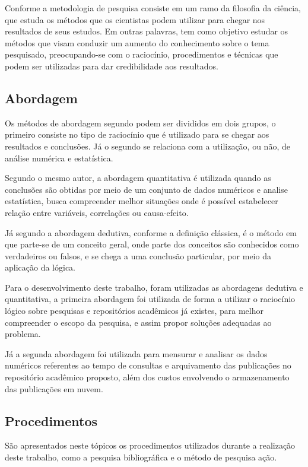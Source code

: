 Conforme \citep[p. 15]{LOVATO:metodologia} a metodologia de pesquisa
consiste em um ramo da filosofia da ciência, que estuda os métodos que
os cientistas podem utilizar para chegar nos resultados de seus estudos.
Em outras palavras, tem como objetivo estudar os métodos que visam
conduzir um aumento do conhecimento sobre o tema pesquisado, preocupando-se
com o raciocínio, procedimentos e técnicas que podem ser utilizadas para
dar credibilidade aos resultados.

\subsection{Abordagem}

Os métodos de abordagem segundo \citep[p. 29]{LOVATO:metodologia} podem ser
divididos em dois grupos, o primeiro consiste no tipo de raciocínio que
é utilizado para se chegar aos resultados e conclusões. Já o segundo
se relaciona com a utilização, ou não, de análise numérica e estatística.

Segundo o mesmo autor, a abordagem quantitativa é utilizada quando
as conclusões são obtidas por meio de um conjunto de dados numéricos
e analise estatística, busca compreender melhor situações onde é possível
estabelecer relação entre variáveis, correlações ou causa-efeito.

Já segundo \cite{GIL:metodologia} a abordagem dedutiva, conforme a definição clássica,
é o método em que parte-se de um conceito geral, onde parte dos
conceitos são conhecidos como verdadeiros ou falsos, e se chega
a uma conclusão particular, por meio da aplicação da lógica.

Para o desenvolvimento deste trabalho, foram utilizadas as abordagens
dedutiva e quantitativa, a primeira abordagem foi utilizada
de forma a utilizar o raciocínio lógico sobre pesquisas e repositórios
acadêmicos já existes, para melhor compreender o escopo da pesquisa,
e assim propor soluções adequadas ao problema.

Já a segunda abordagem foi utilizada para mensurar e analisar
os dados numéricos referentes ao tempo de consultas e arquivamento
das publicações no repositório acadêmico proposto, além dos
custos envolvendo o armazenamento das publicações em nuvem.

\subsection{Procedimentos}

São apresentados neste tópicos os procedimentos utilizados
durante a realização deste trabalho, como a pesquisa bibliográfica e
o método de pesquisa ação.

